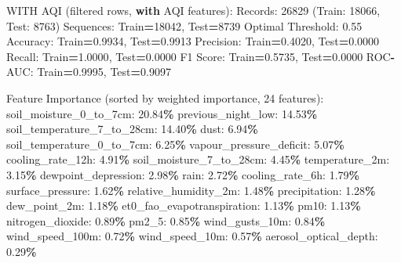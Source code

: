 \documentclass[
  letterpaper,
  DIV=11,
  numbers=noendperiod]{scrartcl}
\newenvironment{Shaded}{\begin{snugshade}}{\end{snugshade}}
\newcommand{\BuiltInTok}[1]{#1}
\newcommand{\ControlFlowTok}[1]{\textcolor[rgb]{0.13,0.29,0.53}{\textbf{#1}}}
\newcommand{\DecValTok}[1]{\textcolor[rgb]{0.00,0.00,0.81}{#1}}
\newcommand{\FloatTok}[1]{\textcolor[rgb]{0.00,0.00,0.81}{#1}}
\newcommand{\NormalTok}[1]{#1}
\newcommand{\OperatorTok}[1]{\textcolor[rgb]{0.81,0.36,0.00}{\textbf{#1}}}
\begin{document}
\begin{Shaded}
\begin{Highlighting}[]
\NormalTok{WITH AQI (filtered rows, }\ControlFlowTok{with}\NormalTok{ AQI features):}
\NormalTok{  Records: }\DecValTok{26829}\NormalTok{ (Train: }\DecValTok{18066}\NormalTok{, Test: }\DecValTok{8763}\NormalTok{)}
\NormalTok{  Sequences: Train}\OperatorTok{=}\DecValTok{18042}\NormalTok{, Test}\OperatorTok{=}\DecValTok{8739}
\NormalTok{  Optimal Threshold: }\FloatTok{0.55}
\NormalTok{  Accuracy: Train}\OperatorTok{=}\FloatTok{0.9934}\NormalTok{, Test}\OperatorTok{=}\FloatTok{0.9913}
\NormalTok{  Precision: Train}\OperatorTok{=}\FloatTok{0.4020}\NormalTok{, Test}\OperatorTok{=}\FloatTok{0.0000}
\NormalTok{  Recall: Train}\OperatorTok{=}\FloatTok{1.0000}\NormalTok{, Test}\OperatorTok{=}\FloatTok{0.0000}
\NormalTok{  F1 Score: Train}\OperatorTok{=}\FloatTok{0.5735}\NormalTok{, Test}\OperatorTok{=}\FloatTok{0.0000}
\NormalTok{  ROC}\OperatorTok{{-}}\NormalTok{AUC: Train}\OperatorTok{=}\FloatTok{0.9995}\NormalTok{, Test}\OperatorTok{=}\FloatTok{0.9097}

\NormalTok{  Feature Importance (}\BuiltInTok{sorted}\NormalTok{ by weighted importance, }\DecValTok{24}\NormalTok{ features):}
\NormalTok{    soil\_moisture\_0\_to\_7cm: }\FloatTok{20.84}\OperatorTok{\%}
\NormalTok{    previous\_night\_low: }\FloatTok{14.53}\OperatorTok{\%}
\NormalTok{    soil\_temperature\_7\_to\_28cm: }\FloatTok{14.40}\OperatorTok{\%}
\NormalTok{    dust: }\FloatTok{6.94}\OperatorTok{\%}
\NormalTok{    soil\_temperature\_0\_to\_7cm: }\FloatTok{6.25}\OperatorTok{\%}
\NormalTok{    vapour\_pressure\_deficit: }\FloatTok{5.07}\OperatorTok{\%}
\NormalTok{    cooling\_rate\_12h: }\FloatTok{4.91}\OperatorTok{\%}
\NormalTok{    soil\_moisture\_7\_to\_28cm: }\FloatTok{4.45}\OperatorTok{\%}
\NormalTok{    temperature\_2m: }\FloatTok{3.15}\OperatorTok{\%}
\NormalTok{    dewpoint\_depression: }\FloatTok{2.98}\OperatorTok{\%}
\NormalTok{    rain: }\FloatTok{2.72}\OperatorTok{\%}
\NormalTok{    cooling\_rate\_6h: }\FloatTok{1.79}\OperatorTok{\%}
\NormalTok{    surface\_pressure: }\FloatTok{1.62}\OperatorTok{\%}
\NormalTok{    relative\_humidity\_2m: }\FloatTok{1.48}\OperatorTok{\%}
\NormalTok{    precipitation: }\FloatTok{1.28}\OperatorTok{\%}
\NormalTok{    dew\_point\_2m: }\FloatTok{1.18}\OperatorTok{\%}
\NormalTok{    et0\_fao\_evapotranspiration: }\FloatTok{1.13}\OperatorTok{\%}
\NormalTok{    pm10: }\FloatTok{1.13}\OperatorTok{\%}
\NormalTok{    nitrogen\_dioxide: }\FloatTok{0.89}\OperatorTok{\%}
\NormalTok{    pm2\_5: }\FloatTok{0.85}\OperatorTok{\%}
\NormalTok{    wind\_gusts\_10m: }\FloatTok{0.84}\OperatorTok{\%}
\NormalTok{    wind\_speed\_100m: }\FloatTok{0.72}\OperatorTok{\%}
\NormalTok{    wind\_speed\_10m: }\FloatTok{0.57}\OperatorTok{\%}
\NormalTok{    aerosol\_optical\_depth: }\FloatTok{0.29}\OperatorTok{\%}


\end{Highlighting}
\end{Shaded}
\end{document}
